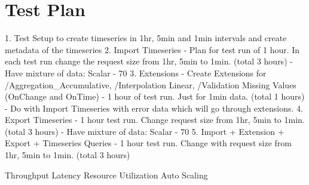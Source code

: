 \section{Test Plan}

1. Test Setup to create timeseries in 1hr, 5min and 1min intervals and create metadata of the timeseries
2. Import Timeseries
  - Plan for test run of 1 hour. In each test run change the request size from 1hr, 5min to 1min. (total 3 hours)
  - Have mixture of data: Scalar - 70%
3. Extensions
  - Create Extensions for /Aggregation\_Accumulative, /Interpolation Linear, /Validation Missing Values (OnChange and OnTime)
  - 1 hour of test run. Just for 1min data. (total 1 hours)
  - Do with Import Timeseries with error data which will go through extensions.
4. Export Timeseries
  - 1 hour test run. Change request size from 1hr, 5min to 1min. (total 3 hours)
  - Have mixture of data: Scalar - 70%
5. Import + Extension + Export + Timeseries Queries
  - 1 hour test run. Change with request size from 1hr, 5min to 1min. (total 3 hours)

Throughput
Latency
Resource Utilization
Auto Scaling